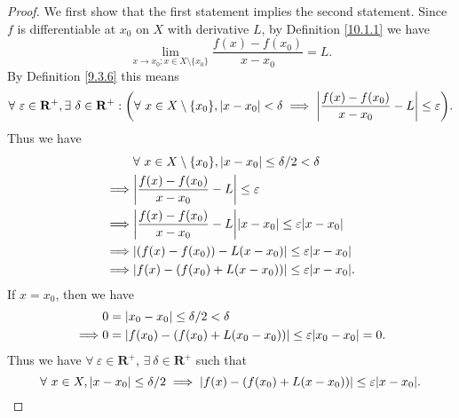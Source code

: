 \begin{proof}
    We first show that the first statement implies the second statement.
    Since \(f\) is differentiable at \(x_0\) on \(X\) with derivative \(L\), by Definition \ref{10.1.1} we have
    \[
        \lim_{x \to x_0 ; x \in X \setminus \{x_0\}} \frac{f(x) - f(x_0)}{x - x_0} = L.
    \]
    By Definition \ref{9.3.6} this means
    \[
        \forall\ \varepsilon \in \mathbf{R}^+, \exists\ \delta \in \mathbf{R}^+ : \bigg(\forall\ x \in X \setminus \{x_0\}, \abs*{x - x_0} < \delta \implies \abs*{\frac{f(x) - f(x_0)}{x - x_0} - L} \leq \varepsilon\bigg).
    \]
    Thus we have
    \begin{align*}
                 & \forall\ x \in X \setminus \{x_0\}, \abs*{x - x_0} \leq \delta / 2 < \delta             \\
        \implies & \abs*{\frac{f(x) - f(x_0)}{x - x_0} - L} \leq \varepsilon                               \\
        \implies & \abs*{\frac{f(x) - f(x_0)}{x - x_0} - L} \abs*{x - x_0} \leq \varepsilon \abs*{x - x_0} \\
        \implies & \abs*{(f(x) - f(x_0)) - L(x - x_0)} \leq \varepsilon \abs*{x - x_0}                     \\
        \implies & \abs*{f(x) - (f(x_0) + L(x - x_0))} \leq \varepsilon \abs*{x - x_0}.
    \end{align*}
    If \(x = x_0\), then we have
    \begin{align*}
                 & 0 = \abs*{x_0 - x_0} \leq \delta / 2 < \delta                                      \\
        \implies & 0 = \abs*{f(x_0) - (f(x_0) + L(x_0 - x_0))} \leq \varepsilon \abs*{x_0 - x_0} = 0.
    \end{align*}
    Thus we have \(\forall\ \varepsilon \in \mathbf{R}^+\), \(\exists\ \delta \in \mathbf{R}^+\) such that
    \[
        \forall\ x \in X, \abs*{x - x_0} \leq \delta / 2 \implies \abs*{f(x) - (f(x_0) + L(x - x_0))} \leq \varepsilon \abs*{x - x_0}.
    \]


\end{proof}
